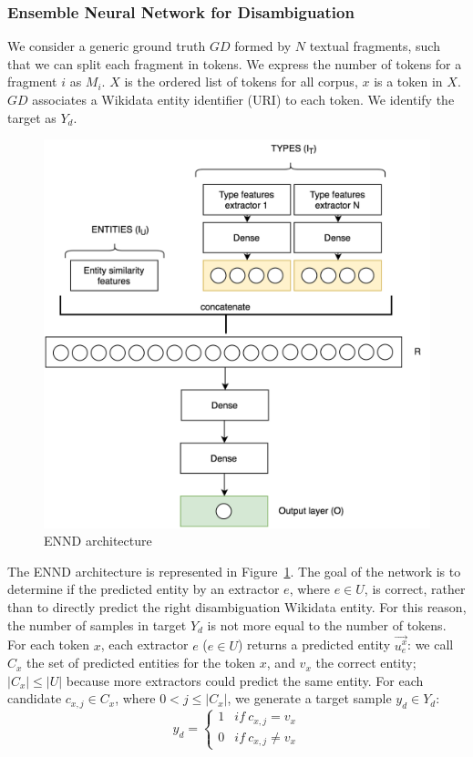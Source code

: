 \documentclass{llncs}
\newcommand{\figref}[1]{\mbox{Figure~\ref{#1}}}
\begin{document}
\subsubsection{Ensemble Neural Network for Disambiguation}
We consider a generic ground truth $GD$ formed by $N$ textual fragments, such that we can split each fragment in tokens. We express the number of tokens for a fragment $i$ as $M_i$. $X$ is the ordered list of tokens for all corpus, $x$ is a token in $X$. $GD$ associates a Wikidata entity identifier (URI) to each token. We identify the target as $Y_d$.

\begin{figure}[!ht]
	\centering
    	\includegraphics[scale=0.25]{NN_disambiguation.png}
 	\caption{ENND architecture}
 	\label{fig:NN_disambiguation}
\end{figure}

The ENND architecture is represented in \figref{fig:NN_disambiguation}. The goal of the network is to determine if the predicted entity by an extractor $e$, where $e \in U$, is correct, rather than to directly predict the right disambiguation Wikidata entity. For this reason, the number of samples in target $Y_d$ is not more equal to the number of tokens. For each token $x$, each extractor $e$ ($e \in U$) returns a predicted entity $\vec{u^{x}_{e}}$: we call $C_x$ the set of predicted entities for the token $x$, and  $v_x$ the correct entity; $\left\vert{C_x}\right\vert \leq \left\vert{U}\right\vert$ because more extractors could predict the same entity.
For each candidate $c_{x,j} \in C_x$, where $0 < j \leq \left\vert{C_x}\right\vert$, we generate a target sample $y_d \in Y_d$:
$$y_d  = \left\{\begin{matrix} 
1 & if \: c_{x,j} =  v_x\\
0 & if \: c_{x,j} \neq v_x
\end{matrix}\right.$$
\end{document}
